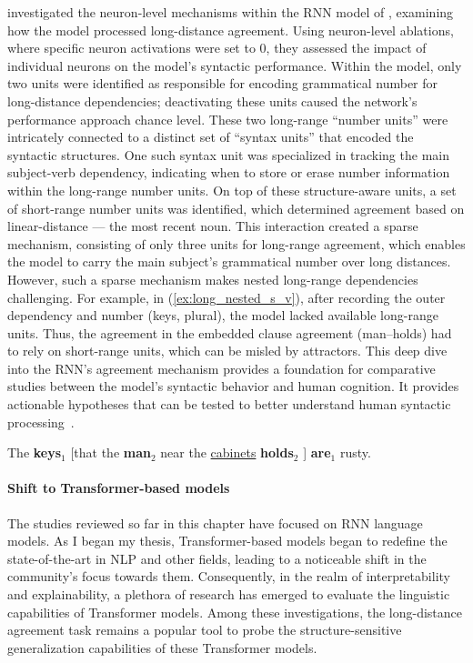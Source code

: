 \cite{lakretz-etal-2019-emergence} investigated the neuron-level mechanisms within the RNN model of \cite{gulordava-etal-2018-colorless}, examining how the model processed long-distance agreement. Using neuron-level ablations, where specific neuron activations were set to 0, they assessed the impact of individual neurons on the model's syntactic performance. 
Within the model, only two units were identified as responsible for encoding grammatical number for long-distance dependencies; deactivating these units caused the network's performance approach chance level. These two long-range ``number units'' were intricately connected to a distinct set of ``syntax units'' that encoded the syntactic structures. One such syntax unit was specialized in tracking the main subject-verb dependency, indicating when to store or erase number information within the long-range number units. On top of these structure-aware units, a set of short-range number units was identified, which determined agreement based on linear-distance --- the most recent noun. This interaction created a sparse mechanism, consisting of only three units for long-range agreement, which enables the model to carry the main subject's grammatical number over long distances. However, such a sparse mechanism makes nested long-range dependencies challenging. For example, in (\ref{ex:long_nested_s_v}),  after recording the outer dependency and number (keys, plural), the model lacked available long-range units. Thus, the agreement in the embedded clause agreement (man--holds) had to rely on short-range units, which can be misled by attractors. This deep dive into the RNN's agreement mechanism provides a foundation for comparative studies between the model's syntactic behavior and human cognition. It provides actionable hypotheses that can be tested to better understand human syntactic processing~\citep{lakretz2020limits,lakretz2021mechanisms}.
\begin{exe}
    \ex \label{ex:long_nested_s_v}  The \textbf{keys$_1$} [that the \textbf{man$_2$} near the \underline{cabinets} \textbf{holds$_2$} ] \textbf{are$_1$} rusty.
\end{exe}


\paragraph{Shift to Transformer-based models} The studies reviewed so far in this chapter have focused on RNN language models. As I began my thesis, Transformer-based models began to redefine the state-of-the-art in NLP and other fields, leading to a noticeable shift in the community's focus towards them. Consequently, in the realm of interpretability and explainability, a plethora of research has emerged to evaluate the linguistic capabilities of Transformer models. Among these investigations, the long-distance agreement task remains a popular tool to probe the structure-sensitive generalization capabilities of these Transformer models. 

